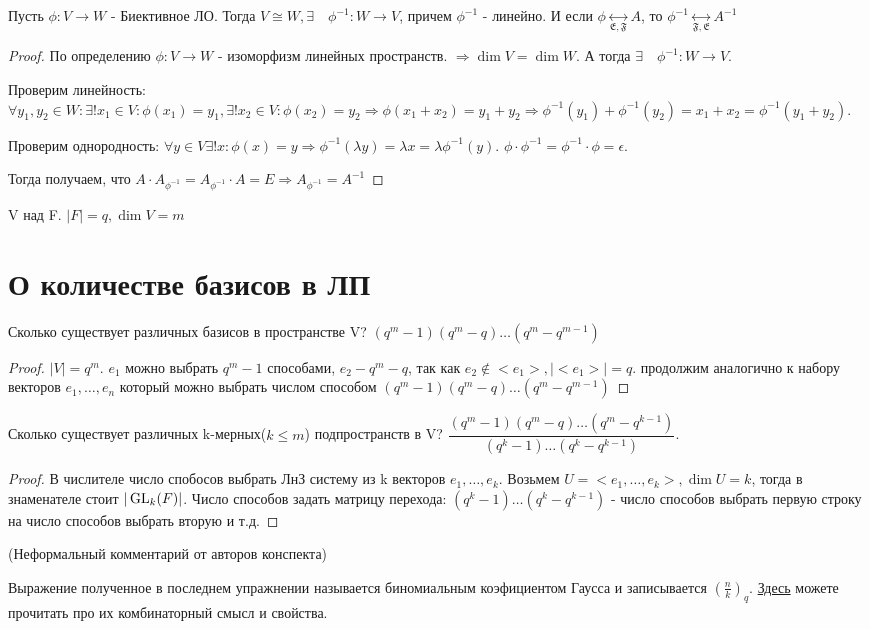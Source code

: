 \begin{theorem}
	Пусть \(\phi: V\to W\) - Биективное ЛО. Тогда \(V\cong W, \exists \quad \phi^{-1}:W\to V\), причем \(\phi ^{-1} \) - линейно.
	 И если \(\phi\underset{\mathfrak{E}, \mathfrak{F}}{\longleftrightarrow} A\), то \(\phi^{-1}\underset{\mathfrak{F}, \mathfrak{E}}{\longleftrightarrow} A^{-1}\)
\end{theorem}
\begin{proof}
	По определению \(\phi: V\to W\) - изоморфизм линейных пространств. \(\Longrightarrow \dim V = \dim W\). 
	А тогда \(\exists\quad\phi^{-1}:W\to V\). 
	
	Проверим линейность: \(\forall y_1, y_2 \in W: \exists! x_1\in V: \phi(x_1) = y_1, \exists! x_2\in V: \phi(x_2) = y_2 \Longrightarrow \phi(x_1+x_2) = y_1+y_2 \Longrightarrow \phi^{-1}(y_1)+\phi^{-1}(y_2) = x_1 + x_2 = \phi^{-1}(y_1+y_2)\). 
	
	Проверим однородность: \(\forall y\in V \exists ! x: \phi(x) = y \Longrightarrow \phi^{-1}(\lambda y) = \lambda x = \lambda\phi^{-1}(y)\). \(\phi\cdot \phi^{-1} = \phi^{-1}\cdot\phi = \epsilon \). 
	
	Тогда получаем, что \(A\cdot A_{\phi^{-1}} = A_{\phi^{-1}}\cdot A = E \Longrightarrow A_{\phi^{-1}} = A^{-1}\)
\end{proof}
V над F. \(|F| = q, \dim V = m\)

\section{О количестве базисов в ЛП}
\begin{exercise}
	Сколько существует различных базисов в пространстве V? \((q^m-1)(q^m-q)\ldots(q^m-q^{m-1})\)
\end{exercise}
\begin{proof}
	\(|V| = q^m\). \(e_1 \) можно выбрать \(q^m -1\) способами, \(e_2 - q^m - q\), так как \(e_2\not\in <e_1>, |<e_1>| = q\). продолжим аналогично к набору векторов \(e_1, \ldots, e_n\) который можно выбрать числом способом  \((q^m-1)(q^m-q)\ldots(q^m-q^{m-1})\)
\end{proof}
\begin{exercise}
	Сколько существует различных k-мерных(\(k\le m\)) подпространств в V? \(\dfrac{(q^m-1)(q^m-q)\ldots(q^m-q^{k-1})}{(q^k-1)\ldots(q^k-q^{k-1})}\).
\end{exercise}
\begin{proof}
	 В числителе число спобосов выбрать ЛнЗ систему из k векторов \(e_1, \ldots, e_k\). Возьмем \(U = <e_1, \ldots, e_k>, \dim U = k\), тогда в знаменателе стоит \(|\operatorname{GL}_k(F)|\). Число способов задать матрицу перехода: \((q^k-1)\ldots(q^k-q^{k-1})\) - число способов выбрать первую строку на число способов выбрать вторую и т.д.
\end{proof}
\begin{note} (Неформальный комментарий от авторов конспекта)

	Выражение полученное в последнем упражнении называется биномиальным коэфициентом Гаусса и записывается \((\frac{n}{k})_q\). \href{https://ru.wikipedia.org/wiki/Гауссовы_биномиальные_коэффициенты}{Здесь} можете прочитать про их комбинаторный смысл и свойства.

\end{note}
